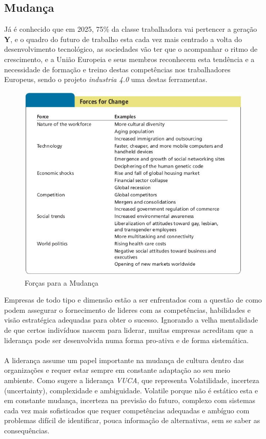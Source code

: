 \subsection{Mudança}
\qquad Já é conhecido que em \textsf{2025}, 75\% da classe trabalhadora vai pertencer a geração \textbf{Y}, e o quadro do futuro de trabalho esta cada vez mais centrado a volta do desenvolvimento tecnológico, as sociedades vão ter que o acompanhar o ritmo de crescimento, e a União Europeia e seus membros reconhecem esta tendência e a necessidade de formação e treino destas competências nos trabalhadores Europeus, sendo o projeto \textit{industria 4.0} uma destas ferramentas.
\begin{figure}[H]
	\centering
	\includegraphics[scale=0.52]{./image/Change/Forces for Change.jpg}
	\caption{Forças para a Mudança \cite{book_7}}
\end{figure}
Empresas de todo tipo e dimensão estão a ser enfrentados com a questão de como podem assegurar o fornecimento de lideres com as competências, habilidades e visão estratégica adequadas para obter o sucesso. Ignorando a velha mentalidade de que certos indivíduos nascem para liderar, muitas empresas acreditam que a liderança pode ser desenvolvida numa forma pro-ativa e de forma sistemática.\cite{book_6}\\
\\
A liderança assume um papel importante na mudança de cultura dentro das organizações e requer estar sempre em constante adaptação ao seu meio ambiente. Como sugere a liderança \textit{VUCA}, que representa Volatilidade, incerteza (uncertainty), complexidade e ambiguidade. Volatile porque não é estático esta e em constante mudança, incerteza na previsão do futuro, complexo com sistemas cada vez mais sofisticados que requer competências adequadas e ambíguo com problemas difícil de identificar, pouca informação de alternativas, sem se saber as consequências.
